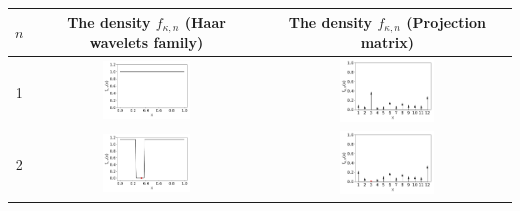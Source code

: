 \documentclass[twoside,11pt]{book}
\numberwithin{theorem}{chapter}
\numberwithin{definition}{chapter}
\numberwithin{proposition}{chapter}
\numberwithin{corollary}{chapter}
\numberwithin{example}{chapter}
\numberwithin{lemma}{chapter}
\numberwithin{assumption}{chapter}
\numberwithin{equation}{chapter}
\numberwithin{figure}{chapter}
\begin{document}
\begin{table}[]
\centering
 \begin{tabular}{| c| c| c|}
 \hline
  $n $ & The density $f_{\kappa,n}$ (Haar wavelets family) & The density $f_{\kappa,n}$ (Projection matrix)\\
 \hline
 1 & \includegraphics[width= 0.4\textwidth, height = 0.16\textheight]{img/Haar/haar_Ensemble_1D_conditional_N_0.pdf} & \includegraphics[width= 0.4\textwidth, height = 0.16\textheight]{img/discrete/discrete_Ensemble_1D_conditional_N_0.pdf}\\ 
 \hline
2 & \includegraphics[width= 0.4\textwidth, height = 0.16\textheight]{img/Haar/haar_Ensemble_1D_conditional_N_1.pdf} & \includegraphics[width= 0.4\textwidth, height = 0.16\textheight]{img/discrete/discrete_Ensemble_1D_conditional_N_1.pdf}\\
\hline

\end{tabular}
\end{table}
\end{document}
